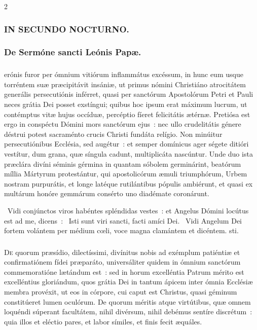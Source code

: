 \documentclass[9pt,twoside]{extarticle}
\begin{document}
\begin{multicols}{2}
{\subsubsection*{\center \textsc{IN SECUNDO NOCTURNO.}}
\subsubsection*{\center De Sermóne sancti Leónis Papæ.}
\subsubsection*{\center {}}
erónis furor per ómnium vitiórum inflammátus excéssum, in hunc eum usque torréntem suæ præcipitávit insániæ, ut primus nómini Christiáno atrocitátem generális persecutiónis inférret, quasi per sanctórum Apostolórum Petri et Pauli neces grátia Dei posset exstíngui; quibus hoc ipsum erat máximum lucrum, ut contémptus vitæ hujus occíduæ, percéptio fíeret felicitátis ætérnæ. Pretiósa est ergo in conspéctu Dómini mors sanctórum ejus~: nec ullo crudelitátis génere déstrui potest sacraménto crucis Christi fundáta relígio. Non minúitur persecutiónibus Ecclésia, sed augétur~: et semper domínicus ager ségete ditióri vestítur, dum grana, quæ síngula cadunt, multiplicáta nascúntur. Unde duo ista præclára divíni séminis gérmina in quantam sóbolem germinárint, beatórum míllia Mártyrum protestántur, qui apostolicórum æmuli triumphórum, Urbem nostram purpurátis, et longe latéque rutilántibus pópulis ambiérunt, et quasi ex multárum honóre gemmárum consérto uno diadémate coronárunt.

\begin{tightlist}{}
\item {}~Vidi conjúnctos viros habéntes spléndidas vestes~: et Angelus Dómini locútus est ad me, dicens~: \textred{*}~Isti sunt viri sancti, facti amíci Dei. ~Vidi Angelum Dei fortem volántem per médium cœli, voce magna clamántem et dicéntem. sti.
\end{tightlist}

\subsubsection*{\center {}}
\lettrine{D}e quorum præsídio, dilectíssimi, divínitus nobis ad exémplum patiéntiæ et confirmatiónem fídei præparáto, universáliter quidem in ómnium sanctórum commemoratióne lætándum est~: sed in horum excelléntia Patrum mérito est excelléntius gloriándum, quos grátia Dei in tantum ápicem inter ómnia Ecclésiæ membra provéxit, ut eos in córpore, cui caput est Christus, quasi géminum constitúeret lumen oculórum. De quorum méritis atque virtútibus, quæ omnem loquéndi súperant facultátem, nihil divérsum, nihil debémus sentíre discrétum~: quia illos et eléctio pares, et labor símiles, et finis fecit æquáles.

}
\end{multicols}
\end{document}
